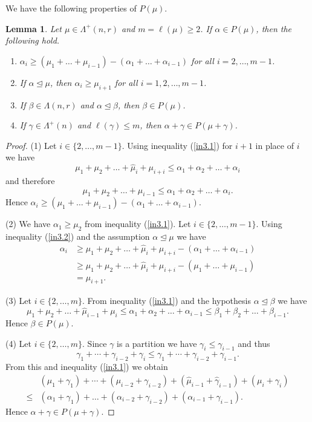 \documentclass[11pt]{article}
\newtheorem{lemma}[theo]{Lemma}
\theoremstyle{definition}
\numberwithin{equation}{section}
\newcommand{\al}{\alpha}
\newcommand{\La}{\Lambda}
\numberwithin{equation}{section}
\begin{document}
We have the following properties of $P(\mu)$.	
	\begin{lemma}\label{rem11}Let $\mu\in \La^+(n,r)$ and $m=\ell(\mu) \ge 2$. If $\al \in P(\mu)$, then the following hold. \begin{enumerate} \item $\alpha_{i} \ge (\mu_1+\dots+\mu_{i-1})-(\alpha_1 +\dots+\alpha_{i-1})$ for all $i=2,\dots,m-1$. \item If $\al \unlhd \mu$, then $\alpha_i \ge \mu_{i+1}$ for all $i=1,2,\dots,m-1$.  \item If $\beta \in \La(n,r)$ and $\al \unlhd \beta$, then $\beta \in P(\mu)$. \item If $\gamma \in \Lambda^+(n)$ and $\ell(\gamma) \le m$, then $\alpha+\gamma \in P(\mu +\gamma)$.\end{enumerate} \end{lemma}
	\begin{proof}
		(1) Let $ i \in \{2, \dots, m-1\}$. Using inequality (\ref{in3.1}) for $i+1$ in place of $i$ we have \begin{equation}\label{in3.2}\mu_1 +\mu_2 + \dots +\widehat{\mu}_{i}+\mu_{i+i} \le \al_1+\al_2+\dots+\al_{i}\end{equation} and therefore
		\[\mu_1 +\mu_2 + \dots +\mu_{i-1} \le \al_1+\al_2+\dots+\al_{i}.\] Hence  
	$\alpha_{i} \ge (\mu_1+\dots+\mu_{i-1})-(\alpha_1 +\dots+\alpha_{i-1})$.
	
	(2)	We have $\alpha_1 \ge \mu_2$ from inequality (\ref{in3.1}). Let $ i \in \{2, \dots, m-1\}$. Using inequality (\ref{in3.2}) and the assumption $\al \unlhd \mu$ we have \begin{align*}
		\alpha_i &\ge \mu_1 +\mu_2 + \dots +\widehat{\mu}_{i}+\mu_{i+i} -(\alpha_1 +\dots+\alpha_{i-1})\\ &\ge \mu_1 +\mu_2 + \dots +\widehat{\mu}_{i}+\mu_{i+i} -(\mu_1 +\dots+\mu_{i-1})\\&=\mu_{i+1}.
	\end{align*}
	
	(3) Let $ i \in \{2, \dots, m\}$. From inequality (\ref{in3.1}) and the hypothesis $\al \unlhd \beta$ we have \[ \mu_1 +\mu_2 + \dots +\widehat{\mu}_{i-1}+\mu_{i} \le \al_1+\al_2+\dots+\al_{i-1} \le \beta_1+\beta_2+\dots+\beta_{i-1}.\] Hence $\beta \in P(\mu)$.
	
	(4) Let $ i \in \{2, \dots, m\}$. Since $\gamma$ is a partition we have $\gamma_i \le \gamma_{i-1}$ and thus \[\gamma_1+\cdots +\gamma_{i-2} + \gamma_i \le \gamma_1+ \cdots +\gamma_{i-2} +\gamma_{i-1}. \] From this and inequality (\ref{in3.1}) we obtain
	 \begin{align*}
		&(\mu_1+\gamma_1)+\cdots +(\mu_{i-2}+\gamma_{i-2})+ (\widehat{\mu}_{i-1}+\widehat{\gamma}_{i-1})+(\mu_{i} + \gamma_i) \\ \le& (\alpha_1 + \gamma_1) +\dots+ (\alpha_{i-2}+\gamma_{i-2}) + (\al_{i-1}+\gamma_{i-1}).
	\end{align*}
	Hence $\alpha + \gamma \in P(\mu +\gamma)$.\end{proof}
\end{document}

